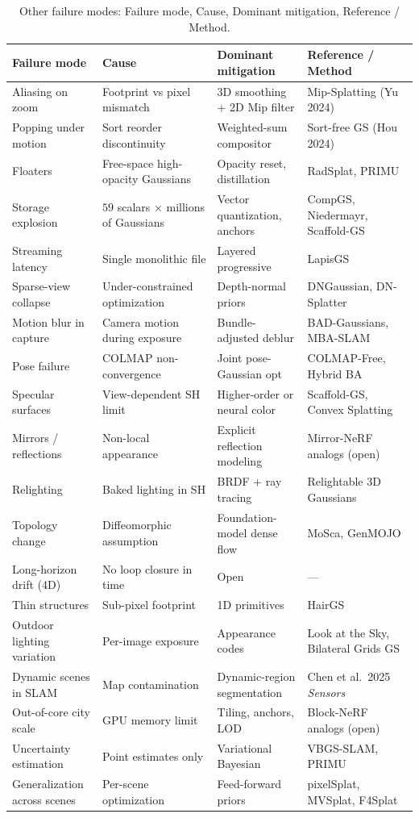 \documentclass{article}
\begin{document}
\begin{table}[t]
\centering
\caption{Other failure modes: Failure mode, Cause, Dominant mitigation, Reference / Method.}
\label{tab:other-failure-modes}
\begin{tabular}{>{\raggedright\arraybackslash}p{0.2205\linewidth}
  >{\raggedright\arraybackslash}p{0.2835\linewidth}
  >{\raggedright\arraybackslash}p{0.2205\linewidth}
  >{\raggedright\arraybackslash}p{0.2756\linewidth}}
\toprule
\textbf{Failure mode} & \textbf{Cause} & \textbf{Dominant mitigation} & \textbf{Reference / Method} \\
\midrule
Aliasing on zoom & Footprint vs pixel mismatch & 3D smoothing + 2D Mip filter & Mip-Splatting (Yu 2024) \\
Popping under motion & Sort reorder discontinuity & Weighted-sum compositor & Sort-free GS (Hou 2024) \\
Floaters & Free-space high-opacity Gaussians & Opacity reset, distillation & RadSplat, PRIMU \\
Storage explosion & \(59\) scalars × millions of Gaussians & Vector quantization, anchors & CompGS, Niedermayr, Scaffold-GS \\
Streaming latency & Single monolithic file & Layered progressive & LapisGS \\
Sparse-view collapse & Under-constrained optimization & Depth-normal priors & DNGaussian, DN-Splatter \\
Motion blur in capture & Camera motion during exposure & Bundle-adjusted deblur & BAD-Gaussians, MBA-SLAM \\
Pose failure & COLMAP non-convergence & Joint pose-Gaussian opt & COLMAP-Free, Hybrid BA \\
Specular surfaces & View-dependent SH limit & Higher-order or neural color & Scaffold-GS, Convex Splatting \\
Mirrors / reflections & Non-local appearance & Explicit reflection modeling & Mirror-NeRF analogs (open) \\
Relighting & Baked lighting in SH & BRDF + ray tracing & Relightable 3D Gaussians \\
Topology change & Diffeomorphic assumption & Foundation-model dense flow & MoSca, GenMOJO \\
Long-horizon drift (4D) & No loop closure in time & Open & --- \\
Thin structures & Sub-pixel footprint & 1D primitives & HairGS \\
Outdoor lighting variation & Per-image exposure & Appearance codes & Look at the Sky, Bilateral Grids GS \\
Dynamic scenes in SLAM & Map contamination & Dynamic-region segmentation & Chen et al.~2025 \emph{Sensors} \\
Out-of-core city scale & GPU memory limit & Tiling, anchors, LOD & Block-NeRF analogs (open) \\
Uncertainty estimation & Point estimates only & Variational Bayesian & VBGS-SLAM, PRIMU \\
Generalization across scenes & Per-scene optimization & Feed-forward priors & pixelSplat, MVSplat, F4Splat \\
\end{tabular}
\end{table}
\end{document}
